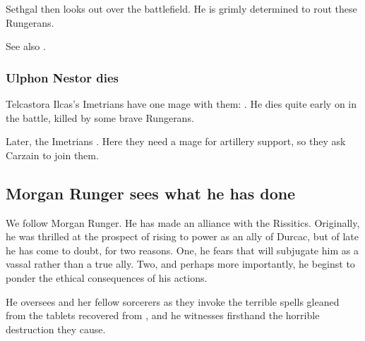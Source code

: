 Sethgal then looks out over the battlefield.
He is grimly determined to rout these Rungerans. 


See also \cite{RobertEHoward:KingsoftheNight}. 





\subsubsection{Ulphon Nestor dies}
Telcastora Ilcas's Imetrians have one mage with them: 
. 
He dies quite early on in the battle, killed by some brave Rungerans. 

Later, the Imetrians .
Here they need a mage for artillery support, so they ask Carzain to join them. 









\subsection{Morgan Runger sees what he has done}
We follow Morgan Runger. He has made an alliance with the Rissitics. Originally, he was thrilled at the prospect of rising to power as an ally of Durcac, but of late he has come to doubt, for two reasons. One, he fears that \Nechsain{} will subjugate him as a vassal rather than a true ally. Two, and perhaps more importantly, he beginst to ponder the ethical consequences of his actions. 

He oversees \Takestsha{} and her fellow sorcerers as they invoke the terrible spells gleaned from the tablets recovered from \Rungertemple, and he witnesses firsthand the horrible destruction they cause. 

